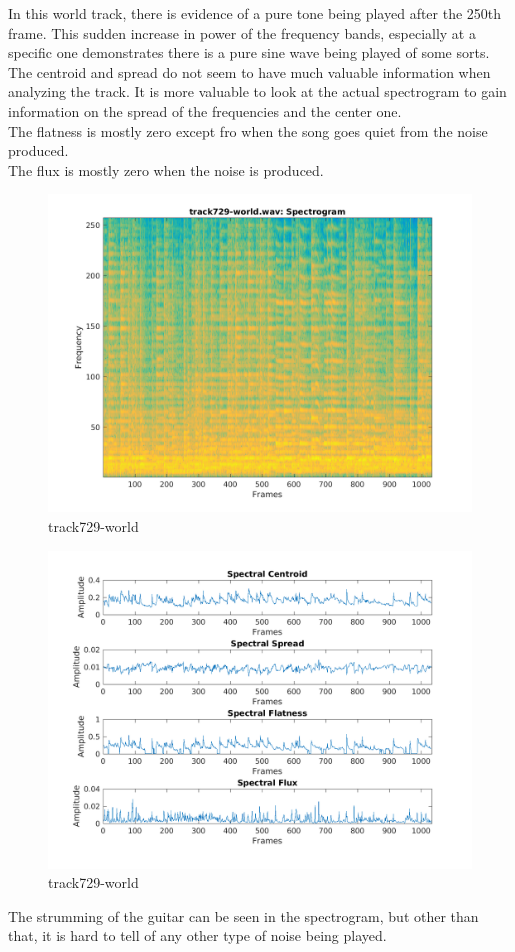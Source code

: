\documentclass[11pt, a4paper]{article}
\begin{document}
In this world track, there is evidence of a pure tone being played after the 250th frame. This sudden increase in power of the frequency bands, especially at a specific one demonstrates there is a pure sine wave being played of some sorts. \\

The centroid and spread do not seem to have much valuable information when analyzing the track. It is more valuable to look at the actual spectrogram to gain information on the spread of the frequencies and the center one. \\

The flatness is mostly zero except fro when the song goes quiet from the noise produced. \\

The flux is mostly zero when the noise is produced. 
\pagebreak
\begin{figure}[H]
    \centering
    \includegraphics[width=.75\textwidth]{track729-world-specto.png}
    \caption{track729-world}
\end{figure}
\begin{figure}[H]
    \centering
    \includegraphics[width=1\textwidth]{track729-world-spectral.png}
    \caption{track729-world}
\end{figure}
\pagebreak
The strumming of the guitar can be seen in the spectrogram, but other than that, it is hard to tell of any other type of noise being played. \\
\end{document}

